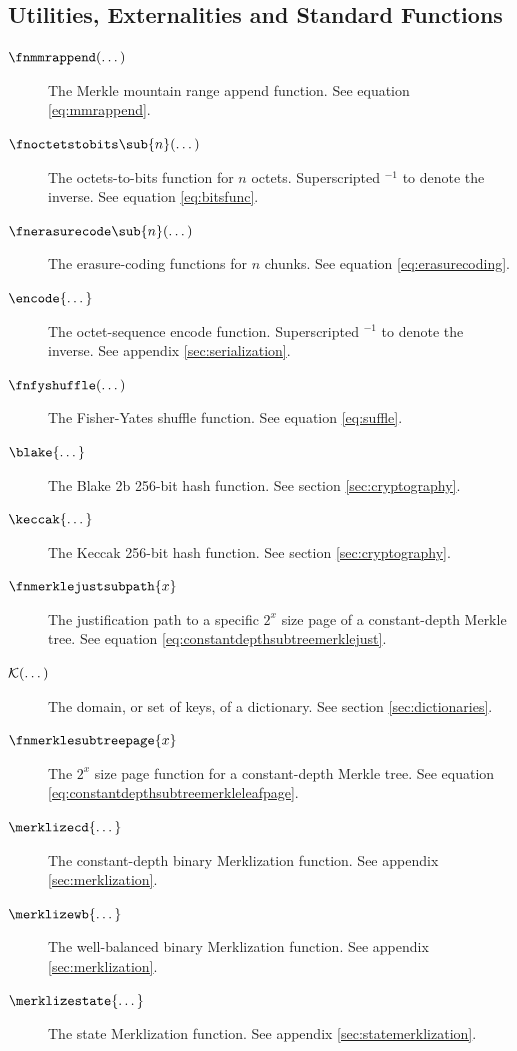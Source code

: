 \subsection{Utilities, Externalities and Standard Functions}

\begin{description}
  \item[$\fnmmrappend(\dots)$] The Merkle mountain range append function. See equation \ref{eq:mmrappend}.
  \item[$\fnoctetstobits\sub{n}(\dots)$] The octets-to-bits function for $n$ octets. Superscripted ${}^{-1}$ to denote the inverse. See equation \ref{eq:bitsfunc}.
  \item[$\fnerasurecode\sub{n}(\dots)$] The erasure-coding functions for $n$ chunks. See equation \ref{eq:erasurecoding}.
  \item[$\encode{\dots}$] The octet-sequence encode function. Superscripted ${}^{-1}$ to denote the inverse. See appendix \ref{sec:serialization}.
  \item[$\fnfyshuffle(\dots)$] The Fisher-Yates shuffle function. See equation \ref{eq:suffle}.
  \item[$\blake{\dots}$] The Blake 2b 256-bit hash function. See section \ref{sec:cryptography}.
  \item[$\keccak{\dots}$] The Keccak 256-bit hash function. See section \ref{sec:cryptography}.


  \item[$\fnmerklejustsubpath{x}$] The justification path to a specific $2^x$ size page of a constant-depth Merkle tree. See equation \ref{eq:constantdepthsubtreemerklejust}.
  \item[$\mathcal{K}(\dots)$] The domain, or set of keys, of a dictionary. See section \ref{sec:dictionaries}.
  \item[$\fnmerklesubtreepage{x}$] The $2^x$ size page function for a constant-depth Merkle tree. See equation \ref{eq:constantdepthsubtreemerkleleafpage}.
  \item[$\merklizecd{\dots}$] The constant-depth binary Merklization function. See appendix \ref{sec:merklization}.
  \item[$\merklizewb{\dots}$] The well-balanced binary Merklization function. See appendix \ref{sec:merklization}.
  \item[$\merklizestate{\dots}$] The state Merklization function. See appendix \ref{sec:statemerklization}.


\end{description}
